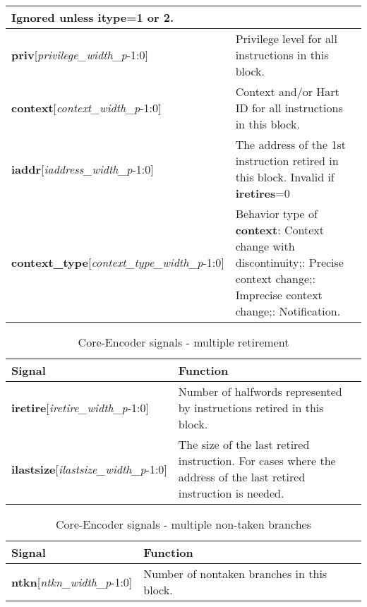 \begin{table}[htp]
\begin{tabulary}{\textwidth}{|l|p{80mm}|}
    Ignored unless \textbf{itype}=1 or 2.\\
        \hline
        \textbf{priv}[\textit{privilege\_width\_p}-1:0] & Privilege level for all instructions in this block.\\
        \hline
        \textbf{context}[\textit{context\_width\_p}-1:0] & Context and/or Hart ID for all instructions in this block.\\
        \hline
        \textbf{iaddr}[\textit{iaddress\_width\_p}-1:0] & The address of the 1st instruction retired in this block.\newline
        Invalid if \textbf{iretires}=0 \\
        \hline
        \textbf{context\_type}[\textit{context\_type\_width\_p}-1:0] & Behavior type of \textbf{context}: Context change with discontinuity;: Precise context change;: Imprecise context change;: Notification.\\
        \hline
    \end{tabulary}
\end{table}

\begin{table}[htp]
    \centering
    \caption{Core-Encoder signals - multiple retirement}
    \label{tab:multi-ingress}
    \begin{tabulary}{\textwidth}{|l|p{80mm}|}
        \hline
        \textbf {Signal} & \textbf {Function} \\
        \hline
        \textbf{iretire}[\textit{iretire\_width\_p}-1:0] & Number of halfwords represented by instructions retired in this block.\\
        \hline
        \textbf{ilastsize}[\textit{ilastsize\_width\_p}-1:0] & The size of the last retired instruction. For cases where the address of the last retired instruction is needed.\\
        \hline
    \end{tabulary}
\end{table}

\begin{table}[htp]
    \centering
    \caption{Core-Encoder signals - multiple non-taken branches}
    \label{tab:multintb-ingress}
    \begin{tabulary}{\textwidth}{|l|p{80mm}|}
        \hline
        \textbf {Signal} & \textbf {Function} \\
        \hline
        \textbf{ntkn}[\textit{ntkn\_width\_p}-1:0] & Number of nontaken branches in this block.\\
        \hline
    \end{tabulary}
\end{table}


